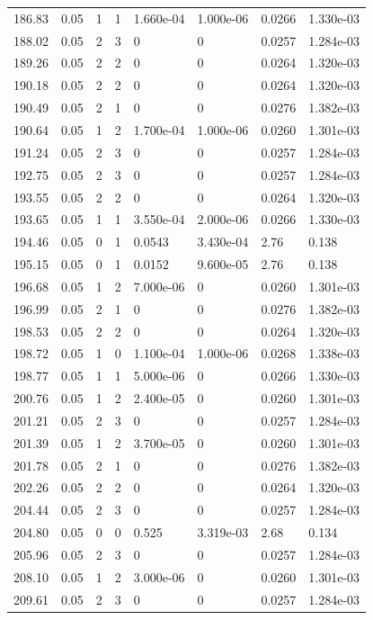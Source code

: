 \documentclass[preview]{standalone}
\begin{document}
{{{{{\begin{tabular}{L{1.2cm}C{1.2cm} C{0.3cm}C{0.5cm} C{1.4cm}C{1.4cm} C{1.4cm}C{1.4cm}}
  186.83  &  0.05  & 1     &  1 &  1.660e-04  & 1.000e-06  & 0.0266 &  1.330e-03   \\ 
  188.02  &  0.05  & 2     &  3 &  0  & 0  & 0.0257 &  1.284e-03   \\ 
  189.26  &  0.05  & 2     &  2 &  0  & 0  & 0.0264 &  1.320e-03   \\ 
  190.18  &  0.05  & 2     &  2 &  0  & 0  & 0.0264 &  1.320e-03   \\ 
  190.49  &  0.05  & 2     &  1 &  0  & 0  & 0.0276 &  1.382e-03   \\ 
  190.64  &  0.05  & 1     &  2 &  1.700e-04  & 1.000e-06  & 0.0260 &  1.301e-03   \\ 
  191.24  &  0.05  & 2     &  3 &  0  & 0  & 0.0257 &  1.284e-03   \\ 
  192.75  &  0.05  & 2     &  3 &  0  & 0  & 0.0257 &  1.284e-03   \\ 
  193.55  &  0.05  & 2     &  2 &  0  & 0  & 0.0264 &  1.320e-03   \\ 
  193.65  &  0.05  & 1     &  1 &  3.550e-04  & 2.000e-06  & 0.0266 &  1.330e-03   \\ 
  194.46  &  0.05  & 0     &  1 &  0.0543  & 3.430e-04  & 2.76 &  0.138   \\ 
  195.15  &  0.05  & 0     &  1 &  0.0152  & 9.600e-05  & 2.76 &  0.138   \\ 
  196.68  &  0.05  & 1     &  2 &  7.000e-06  & 0  & 0.0260 &  1.301e-03   \\ 
  196.99  &  0.05  & 2     &  1 &  0  & 0  & 0.0276 &  1.382e-03   \\ 
  198.53  &  0.05  & 2     &  2 &  0  & 0  & 0.0264 &  1.320e-03   \\ 
  198.72  &  0.05  & 1     &  0 &  1.100e-04  & 1.000e-06  & 0.0268 &  1.338e-03   \\ 
  198.77  &  0.05  & 1     &  1 &  5.000e-06  & 0  & 0.0266 &  1.330e-03   \\ 
  200.76  &  0.05  & 1     &  2 &  2.400e-05  & 0  & 0.0260 &  1.301e-03   \\ 
  201.21  &  0.05  & 2     &  3 &  0  & 0  & 0.0257 &  1.284e-03   \\ 
  201.39  &  0.05  & 1     &  2 &  3.700e-05  & 0  & 0.0260 &  1.301e-03   \\ 
  201.78  &  0.05  & 2     &  1 &  0  & 0  & 0.0276 &  1.382e-03   \\ 
  202.26  &  0.05  & 2     &  2 &  0  & 0  & 0.0264 &  1.320e-03   \\ 
  204.44  &  0.05  & 2     &  3 &  0  & 0  & 0.0257 &  1.284e-03   \\ 
  204.80  &  0.05  & 0     &  0 &  0.525  & 3.319e-03  & 2.68 &  0.134   \\ 
  205.96  &  0.05  & 2     &  3 &  0  & 0  & 0.0257 &  1.284e-03   \\ 
  208.10  &  0.05  & 1     &  2 &  3.000e-06  & 0  & 0.0260 &  1.301e-03   \\ 
  209.61  &  0.05  & 2     &  3 &  0  & 0  & 0.0257 &  1.284e-03   \\ 
\hline 
\end{tabular} 

}}}}}
\end{document}
